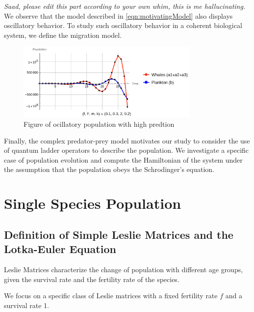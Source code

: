 \documentclass[11pt,reqno]{amsart}
\numberwithin{equation}{section}
\theoremstyle{plain}
\begin{document}
\color{red}
\textit{Saad, please edit this part according to your own whim, this 
is me hallucinating.}
\color{black}
We observe that the model described in \ref{eqn:motivatingModel} 
also displays oscillatory behavior. To study such oscillatory behavior 
in a coherent biological system, we define the migration model. 

\begin{figure}[htp]
    \centering
    \includegraphics[width=0.8\textwidth]{WP_oscillatory.png} %
    \caption{Figure of ocillatory population with high predtion}
    \label{fig:example}
\end{figure}


Finally, the complex predator-prey model motivates our study to consider 
the use of quantum ladder operators to describe the population. We 
investigate a specific case of population evolution and compute the 
Hamiltonian of the system under the assumption that the population 
obeys the Schrodinger's equation. 



\section{Single Species Population}\label{sec:single}


\subsection{Definition of Simple Leslie Matrices and the Lotka-Euler Equation}

Leslie Matrices characterize the change of population with 
different age groups, given the survival rate and the fertility rate 
of the species. 


We focus on a specific class of Leslie matrices with 
a fixed fertility rate $f$ and a survival rate 1. 
\end{document}
